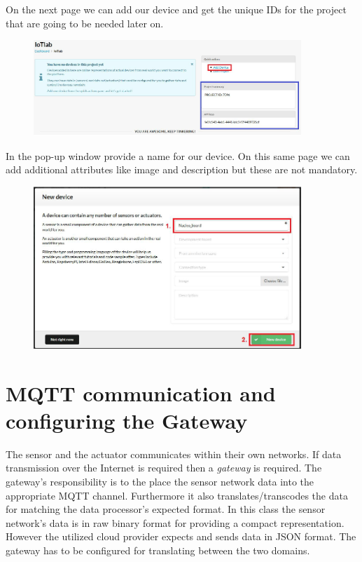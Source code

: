 \documentclass[a4paper]{article}
\begin{document}
On the next page we can add our device and get the unique IDs for the project that are going to be needed later on.

\begin{figure}[H]
    \centering
    \includegraphics[width=0.9\textwidth]{figures/devicehub-adddevice.png}
\end{figure}

In the pop-up window provide a name for our device. On this same page we can add additional attributes like image and
description but these are not mandatory.

\begin{figure}[H]
    \centering
    \includegraphics[width=0.9\textwidth]{figures/devicehub-newdevice.png}
\end{figure}

\section{MQTT communication and configuring the Gateway}

The sensor and the actuator communicates within their own networks.
If data transmission over the Internet is required then a \emph{gateway} is required.
The gateway's responsibility is to the place the sensor network data into the appropriate
MQTT channel. Furthermore it also translates/transcodes the data for matching the
data processor's expected format. In this class the sensor network's data is in raw binary format
for providing a compact representation. However the utilized cloud provider expects and sends
data in JSON format. The gateway has to be configured for translating between the two domains.
\end{document}
